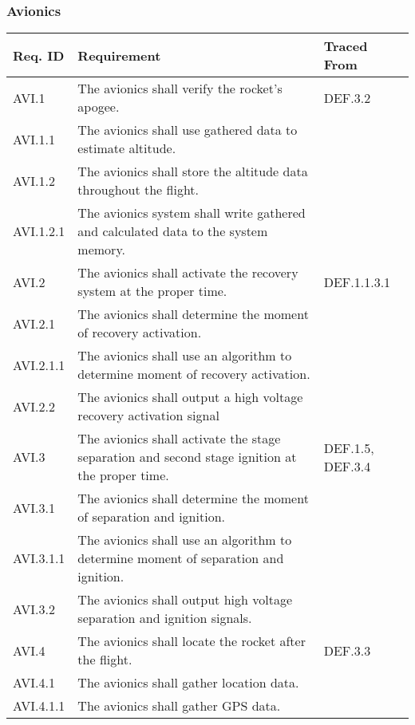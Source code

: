\subsubsection{Avionics}
\begin{table}[htbp] 
    \centering
    \footnotesize 
    \setlength{\tymin}{40pt}
    \let\raggedright\RaggedRight
    
    \begin{tabulary}{\textwidth}{@{}LLL@{}}
    \toprule
        \textbf{Req. ID} & \textbf{Requirement} & \textbf{Traced From} \\
    \midrule
        AVI.1 & The avionics shall verify the rocket's apogee. & DEF.3.2 \\
        AVI.1.1 & The avionics shall use gathered data to estimate altitude. & \\
        AVI.1.2 & The avionics shall store the altitude data throughout the flight. & \\
        AVI.1.2.1 & The avionics system shall write gathered and calculated data to the system memory. & \\
    \midrule
        AVI.2 & The avionics shall activate the recovery system at the proper time. & DEF.1.1.3.1 \\
        AVI.2.1 & The avionics shall determine the moment of recovery activation. & \\
        AVI.2.1.1 & The avionics shall use an algorithm to determine moment of recovery activation. & \\
        AVI.2.2 & The avionics shall output a high voltage recovery activation signal & \\
    \midrule
        AVI.3 & The avionics shall activate the stage separation and second stage ignition at the proper time. & DEF.1.5, DEF.3.4 \\
        AVI.3.1 & The avionics shall determine the moment of separation and ignition. & \\
        AVI.3.1.1 & The avionics shall use an algorithm to determine moment of separation and ignition. & \\
        AVI.3.2 & The avionics shall output high voltage separation and ignition signals. & \\
    \midrule
        AVI.4 & The avionics shall locate the rocket after the flight. & DEF.3.3 \\
        AVI.4.1 & The avionics shall gather location data. & \\
        AVI.4.1.1 & The avionics shall gather GPS data. & \\

\end{tabulary}
\end{table}
